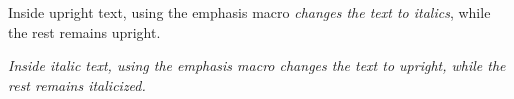 Inside upright text, using the emphasis macro \emph{changes the text to italics}, while the rest remains upright.

{\itshape Inside italic text, using the emphasis macro \emph{changes the text to upright}, while the rest remains italicized.}